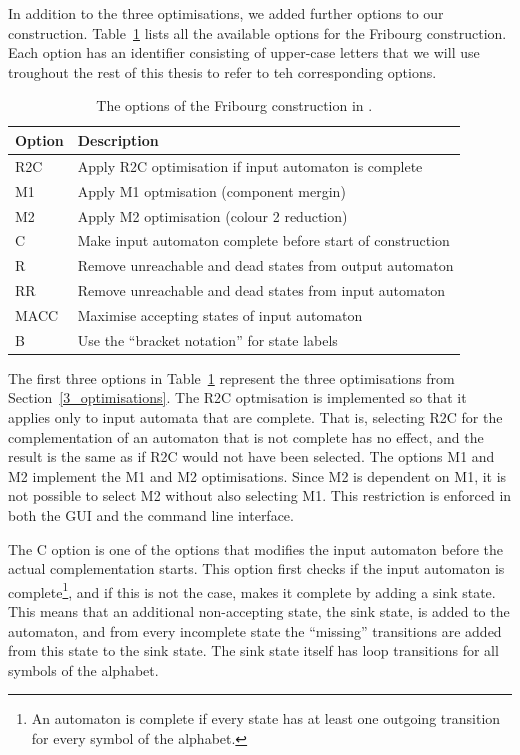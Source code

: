 In addition to the three optimisations, we added further options to our construction. Table~\ref{goal_options} lists all the available options for the Fribourg construction. Each option has an identifier consisting of upper-case letters that we will use troughout the rest of this thesis to refer to teh corresponding options.

\begin{table}
\centering
\begin{tabular}{ll}
\hline
Option & Description \\
\hline
R2C & Apply R2C optimisation if input automaton is complete \\
M1 & Apply M1 optmisation (component mergin) \\
M2 & Apply M2 optimisation (colour 2 reduction) \\
C & Make input automaton complete before start of construction \\
R & Remove unreachable and dead states from output automaton \\
RR & Remove unreachable and dead states from input automaton \\
MACC & Maximise accepting states of input automaton \\
B & Use the ``bracket notation'' for state labels \\
\hline
\end{tabular}
\caption{The options of the Fribourg construction in \goal.}
\label{goal_options}
\end{table}

The first three options in Table~\ref{goal_options} represent the three optimisations from Section~\ref{3_optimisations}. The R2C optmisation is implemented so that it applies only to input automata that are complete. That is, selecting R2C for the complementation of an automaton that is not complete has no effect, and the result is the same as if R2C would not have been selected. The options M1 and M2 implement the M1 and M2 optimisations. Since M2 is dependent on M1, it is not possible to select M2 without also selecting M1. This restriction is enforced in both the GUI and the command line interface.

The C option is one of the options that modifies the input automaton before the actual complementation starts. This option first checks if the input automaton is complete\footnote{An automaton is complete if every state has at least one outgoing transition for every symbol of the alphabet.}, and if this is not the case, makes it complete by adding a sink state. This means that an additional non-accepting state, the sink state, is added to the automaton, and from every incomplete state the ``missing'' transitions are added from this state to the sink state. The sink state itself has loop transitions for all symbols of the alphabet.

